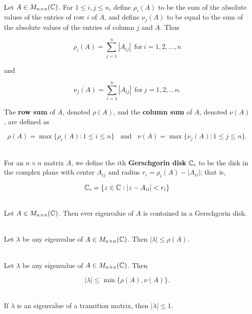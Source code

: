 \begin{definition}
	\hfill\\
	Let $A \in M_{n \times n}(\mathbb{C})$. For $1 \leq i, j \leq n$, define $\rho_i(A)$ to be the sum of the absolute values of the entries of row $i$ of $A$, and define $\nu_j(A)$ to be equal to the sum of the absolute values of the entries of column $j$ and $A$. Thus

	\[\rho_i(A) = \sum_{j=1}^{n}|A_{ij}|\ \ \text{for}\ i=1, 2, \dots, n\]

	and

	\[\nu_j(A) = \sum_{i=1}^{n}|A_{ij}|\ \ \text{for}\ j=1, 2, \dots n.\]

	The \textbf{row sum} of $A$, denoted $\rho(A)$, and the \textbf{column sum} of $A$, denoted $\nu(A)$, are defined as

	\[\rho(A) = \max\{\rho_i(A) : 1 \leq i \leq n\}\ \ \ \ \text{and}\ \ \ \ \nu(A) = \max\{\nu_j(A) : 1 \leq j \leq n\}.\]
\end{definition}

\begin{definition}
	\hfill\\
	For an $n \times n$ matrix $A$, we define the $i$th \textbf{Gerschgorin disk} $\mathbb{C}_i$ to be the disk in the complex plane with center $A_{ij}$ and radius $r_i = \rho_i(A) - |A_{ii}|$; that is,

	\[\mathbb{C}_i = \{z \in \mathbb{C}:|z - A_{ii}| < r_i\}\]
\end{definition}

\begin{theorem}
	\hfill\\
	Let $A \in M_{n \times n}(\mathbb{C})$. Then ever eigenvalue of $A$ is contained in a Gerschgorin disk.
\end{theorem}

\begin{corollary}
	\hfill\\
	Let $\lambda$ be any eigenvalue of $A \in M_{n \times n}(\mathbb{C})$. Then $|\lambda| \leq \rho(A)$.
\end{corollary}

\begin{corollary}
	\hfill\\
	Let $\lambda$ be any eigenvalue of $A \in M_{n \times n}(\mathbb{C})$. Then

	\[|\lambda| \leq \min\{\rho(A), \nu(A)\}.\]
\end{corollary}

\begin{corollary}
	\hfill\\
	If $\lambda$ is an eigenvalue of a transition matrix, then $|\lambda| \leq 1$.
\end{corollary}

